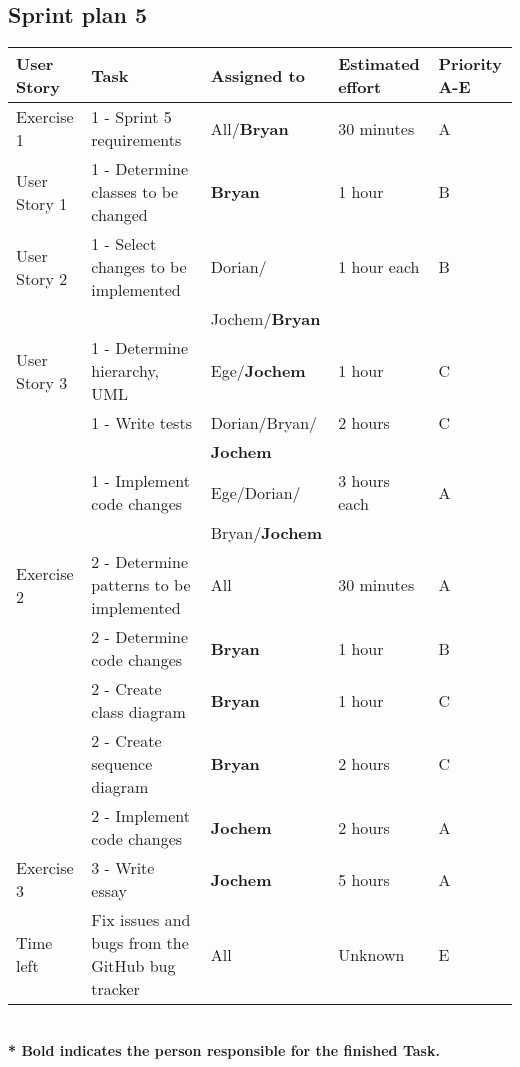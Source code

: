 \documentclass[10pt]{article}
\begin{document}
\begin{center}

\section*{Sprint plan 5}

    \hspace*{-3cm}\begin{tabular}{ | p{2cm} | p{9cm} | p{2.3cm} | p{2cm} | p{2cm} |}
    \hline
    User Story & Task & Assigned to & Estimated effort & Priority A-E \\ \hline
    Exercise 1 & 1 - Sprint 5 requirements & All/\textbf{Bryan} & 30 minutes & A\\ 
    User Story 1 & 1 - Determine classes to be changed & \textbf{Bryan} & 1 hour & B\\
    User Story 2 & 1 - Select changes to be implemented & Dorian/ & 1 hour each & B\\ 
    & & Jochem/\textbf{Bryan} & &\\
    User Story 3 & 1 - Determine hierarchy, UML & Ege/\textbf{Jochem} & 1 hour & C\\ 
    & 1 - Write tests & Dorian/Bryan/  & 2 hours & C\\
    & & \textbf{Jochem} & &\\
    & 1 - Implement code changes & Ege/Dorian/ & 3 hours each& A\\ 
    & & Bryan/\textbf{Jochem} & &\\ \hline    
    Exercise 2 & 2 - Determine patterns to be implemented & All & 30 minutes & A\\ 
    & 2 - Determine code changes & \textbf{Bryan} & 1 hour & B\\
    & 2 - Create class diagram & \textbf{Bryan} & 1 hour & C\\ 
    & 2 - Create sequence diagram & \textbf{Bryan} & 2 hours & C\\ 
    & 2 - Implement code changes & \textbf{Jochem} & 2 hours & A \\ \hline    
    Exercise 3 & 3 - Write essay & \textbf{Jochem} & 5 hours & A\\
    Time left & Fix issues and bugs from the GitHub bug tracker & All & Unknown & E\\ \hline          
    \end{tabular}
    \\ 
    \textbf{* Bold indicates the person responsible for the finished Task. } 
\end{center}
\end{document}
